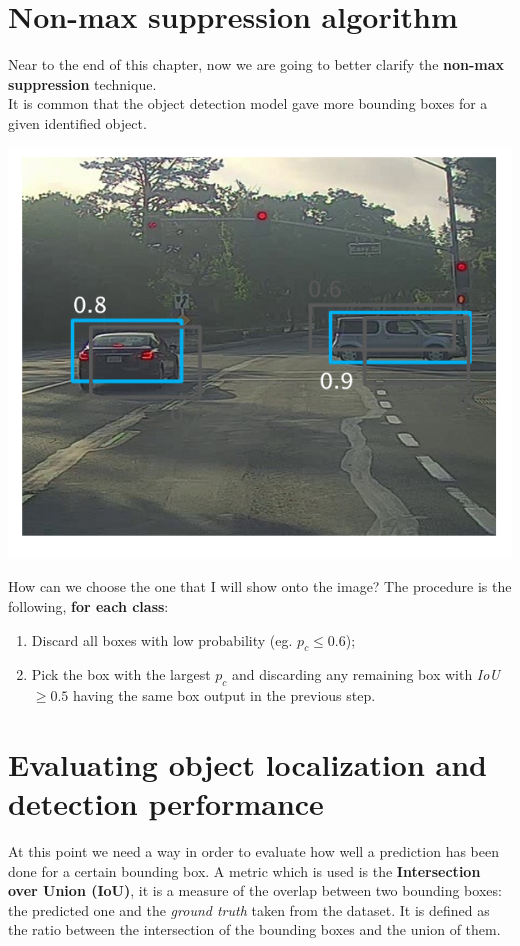 \section{Non-max suppression algorithm}
Near to the end of this chapter, now we are going to better clarify the \textbf{non-max suppression} technique.\\
It is common that the object detection model gave more bounding boxes for a given identified object. 
\begin{multicols}{2}
    \begin{center}
        \includegraphics[scale=0.5]{img/NMS.png}
    \end{center}
    How can we choose the one that I will show onto the image? The procedure is the following, \textbf{for each class}: 
    \begin{enumerate}
        \itemsep-0.2em
        \item Discard all boxes with low probability (eg. $p_c\le{0.6}$); 
        \item Pick the box with the largest $p_c$ and discarding any remaining box with \emph{IoU}$\ge{0.5}$ having the same box output in the previous step.
    \end{enumerate}
\end{multicols}


\section{Evaluating object localization and detection performance}
At this point we need a way in order to evaluate how well a prediction has been done for a certain bounding box. A metric which is used is the \textbf{Intersection over Union (IoU)}, it is a measure of the overlap between two bounding boxes: the predicted one and the \textit{ground truth} taken from the dataset. It is defined as the ratio between the intersection of the bounding boxes and the union of them.

